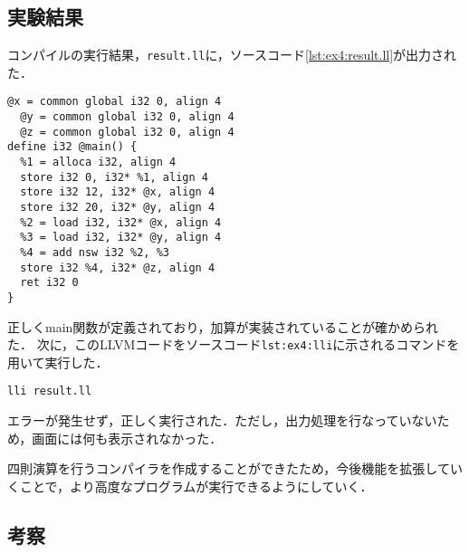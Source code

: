 \documentclass[uplatex]{jsarticle}
\begin{document}
\subsection{実験結果}
コンパイルの実行結果，\verb#result.ll#に，ソースコード\ref{lst:ex4:result.ll}が出力された．

\begin{lstlisting}[caption=result.ll,label=lst:ex4:result.ll]
  @x = common global i32 0, align 4
  @y = common global i32 0, align 4
  @z = common global i32 0, align 4
define i32 @main() {
  %1 = alloca i32, align 4
  store i32 0, i32* %1, align 4
  store i32 12, i32* @x, align 4
  store i32 20, i32* @y, align 4
  %2 = load i32, i32* @x, align 4
  %3 = load i32, i32* @y, align 4
  %4 = add nsw i32 %2, %3
  store i32 %4, i32* @z, align 4
  ret i32 0
}

\end{lstlisting}

正しくmain関数が定義されており，加算が実装されていることが確かめられた．
次に，このLLVMコードをソースコード\verb#lst:ex4:lli#に示されるコマンドを用いて実行した．
\begin{lstlisting}[caption=parserコマンド,label=lst:ex4:lli]
lli result.ll
\end{lstlisting}

エラーが発生せず，正しく実行された．ただし，出力処理を行なっていないため，画面には何も表示されなかった．

四則演算を行うコンパイラを作成することができたため，今後機能を拡張していくことで，より高度なプログラムが実行できるようにしていく．

\subsection{考察}
\end{document}
